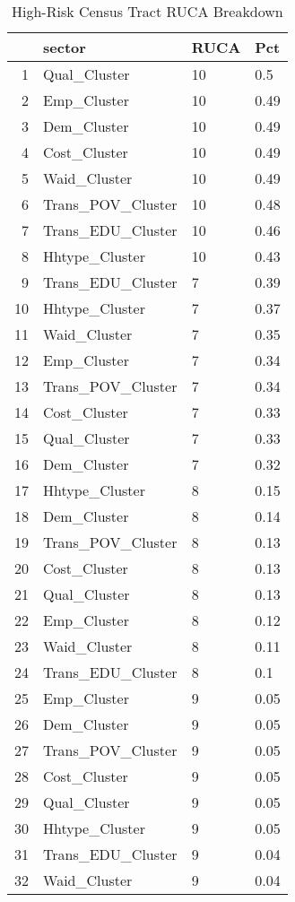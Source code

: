 \begin{table}[ht]
    \caption{High-Risk Census Tract RUCA Breakdown}
    \label{tab:ruca_risk}
    \small
    \centering
    \begin{tabular}{rlll}
        \hline
       & sector & RUCA & Pct \\ 
        \hline
        \hline
      1 & Qual\_Cluster & 10 & 0.5 \\ 
        2 & Emp\_Cluster & 10 & 0.49 \\ 
        3 & Dem\_Cluster & 10 & 0.49 \\ 
        4 & Cost\_Cluster & 10 & 0.49 \\ 
        5 & Waid\_Cluster & 10 & 0.49 \\ 
        6 & Trans\_POV\_Cluster & 10 & 0.48 \\ 
        7 & Trans\_EDU\_Cluster & 10 & 0.46 \\ 
        8 & Hhtype\_Cluster & 10 & 0.43 \\ 
        9 & Trans\_EDU\_Cluster & 7 & 0.39 \\ 
        10 & Hhtype\_Cluster & 7 & 0.37 \\ 
        11 & Waid\_Cluster & 7 & 0.35 \\ 
        12 & Emp\_Cluster & 7 & 0.34 \\ 
        13 & Trans\_POV\_Cluster & 7 & 0.34 \\ 
        14 & Cost\_Cluster & 7 & 0.33 \\ 
        15 & Qual\_Cluster & 7 & 0.33 \\ 
        16 & Dem\_Cluster & 7 & 0.32 \\ 
        17 & Hhtype\_Cluster & 8 & 0.15 \\ 
        18 & Dem\_Cluster & 8 & 0.14 \\ 
        19 & Trans\_POV\_Cluster & 8 & 0.13 \\ 
        20 & Cost\_Cluster & 8 & 0.13 \\ 
        21 & Qual\_Cluster & 8 & 0.13 \\ 
        22 & Emp\_Cluster & 8 & 0.12 \\ 
        23 & Waid\_Cluster & 8 & 0.11 \\ 
        24 & Trans\_EDU\_Cluster & 8 & 0.1 \\ 
        25 & Emp\_Cluster & 9 & 0.05 \\ 
        26 & Dem\_Cluster & 9 & 0.05 \\ 
        27 & Trans\_POV\_Cluster & 9 & 0.05 \\ 
        28 & Cost\_Cluster & 9 & 0.05 \\ 
        29 & Qual\_Cluster & 9 & 0.05 \\ 
        30 & Hhtype\_Cluster & 9 & 0.05 \\ 
        31 & Trans\_EDU\_Cluster & 9 & 0.04 \\ 
        32 & Waid\_Cluster & 9 & 0.04 \\ 
         \hline
      \end{tabular}
      \end{table}